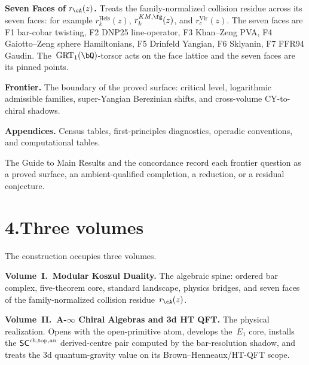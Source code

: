 \medskip

\noindent\textbf{Seven Faces of $r_\cA(z)$.}\enspace
Treats the family-normalized collision residue across its seven faces:
for example $r^{\mathrm{Heis}}_k(z)$, $r^{KM,\fg}_k(z)$, and
$r^{\mathrm{Vir}}_c(z)$. The seven faces are F1
bar-cobar twisting, F2 DNP25 line-operator, F3 Khan--Zeng
PVA, F4 Gaiotto--Zeng sphere Hamiltonians, F5 Drinfeld Yangian, F6
Sklyanin, F7 FFR94 Gaudin. The~$\GRTone(\bQ)$-torsor acts on the
face lattice and the seven faces are its pinned points.

\medskip

\noindent\textbf{Frontier.}\enspace
The boundary of the proved surface: critical level, logarithmic
admissible families, super-Yangian Berezinian shifts, and
cross-volume CY-to-chiral shadows.

\medskip

\noindent\textbf{Appendices.}\enspace
Census tables, first-principles diagnostics, operadic conventions, and
computational tables.

\medskip

The Guide to Main Results and the concordance record each frontier
question as a proved surface, an ambient-qualified completion, a
reduction, or a residual conjecture.

\section*{4.\quad Three volumes}

\noindent
The construction occupies three volumes.

\medskip

\noindent\textbf{Volume~I.\ Modular Koszul Duality.}\enspace
The algebraic spine: ordered bar complex, five-theorem core,
standard landscape, physics bridges, and seven faces of the
family-normalized collision residue~$r_\cA(z)$.

\medskip

\noindent\textbf{Volume~II.\ A-$\infty$ Chiral Algebras and 3d HT
QFT.}\enspace
The physical realization. Opens with the open-primitive atom,
develops the~$E_1$ core, installs the
$\mathsf{SC}^{\mathrm{ch,top,an}}$ derived-centre pair computed by the bar-resolution shadow,
and treats the 3d quantum-gravity value on its Brown--Henneaux/HT-QFT
scope.

\medskip

